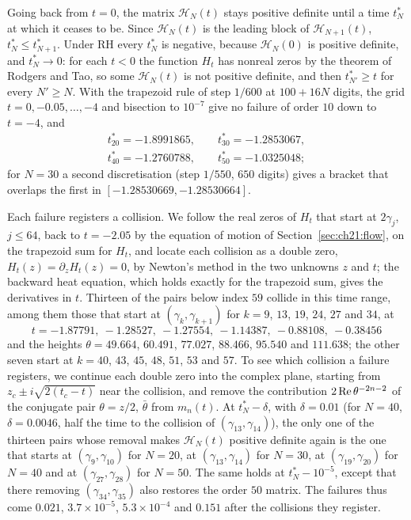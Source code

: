 Going back from $t=0$, the matrix $\mathcal H_N(t)$ stays positive definite until a time $t^*_N$ at which it ceases to be. Since $\mathcal H_N(t)$ is the leading block of $\mathcal H_{N+1}(t)$, $t^*_N\le t^*_{N+1}$. Under RH every $t^*_N$ is negative, because $\mathcal H_N(0)$ is positive definite, and $t^*_N\to0$: for each $t<0$ the function $H_t$ has nonreal zeros by the theorem of Rodgers and Tao, so some $\mathcal H_N(t)$ is not positive definite, and then $t^*_{N'}\ge t$ for every $N'\ge N$. With the trapezoid rule of step $1/600$ at $100+16N$ digits, the grid $t=0,-0.05,\dots,-4$ and bisection to $10^{-7}$ give no failure of order $10$ down to $t=-4$, and
\begin{gather*}
t^*_{20}=-1.8991865,\qquad t^*_{30}=-1.2853067,\\
t^*_{40}=-1.2760788,\qquad t^*_{50}=-1.0325048;
\end{gather*}
for $N=30$ a second discretisation (step $1/550$, $650$ digits) gives a bracket that overlaps the first in $[-1.28530669,-1.28530664]$.

Each failure registers a collision. We follow the real zeros of $H_t$ that start at $2\gamma_j$, $j\le64$, back to $t=-2.05$ by the equation of motion of Section~\ref{sec:ch21:flow}, on the trapezoid sum for $H_t$, and locate each collision as a double zero, $H_t(z)=\partial_zH_t(z)=0$, by Newton's method in the two unknowns $z$ and $t$; the backward heat equation, which holds exactly for the trapezoid sum, gives the derivatives in $t$. Thirteen of the pairs below index $59$ collide in this time range, among them those that start at $(\gamma_k,\gamma_{k+1})$ for $k=9$, $13$, $19$, $24$, $27$ and $34$, at
\[
t=-1.87791,\ -1.28527,\ -1.27554,\ -1.14387,\ -0.88108,\ -0.38456
\]
and the heights $\theta=49.664$, $60.491$, $77.027$, $88.466$, $95.540$ and $111.638$; the other seven start at $k=40$, $43$, $45$, $48$, $51$, $53$ and $57$. To see which collision a failure registers, we continue each double zero into the complex plane, starting from $z_c\pm i\sqrt{2(t_c-t)}$ near the collision, and remove the contribution $2\operatorname{Re}\theta^{-2n-2}$ of the conjugate pair $\theta=z/2$, $\bar\theta$ from $m_n(t)$. At $t^*_N-\delta$, with $\delta=0.01$ (for $N=40$, $\delta=0.0046$, half the time to the collision of $(\gamma_{13},\gamma_{14})$), the only one of the thirteen pairs whose removal makes $\mathcal H_N(t)$ positive definite again is the one that starts at $(\gamma_9,\gamma_{10})$ for $N=20$, at $(\gamma_{13},\gamma_{14})$ for $N=30$, at $(\gamma_{19},\gamma_{20})$ for $N=40$ and at $(\gamma_{27},\gamma_{28})$ for $N=50$. The same holds at $t^*_N-10^{-5}$, except that there removing $(\gamma_{34},\gamma_{35})$ also restores the order $50$ matrix. The failures thus come $0.021$, $3.7\times10^{-5}$, $5.3\times10^{-4}$ and $0.151$ after the collisions they register.


